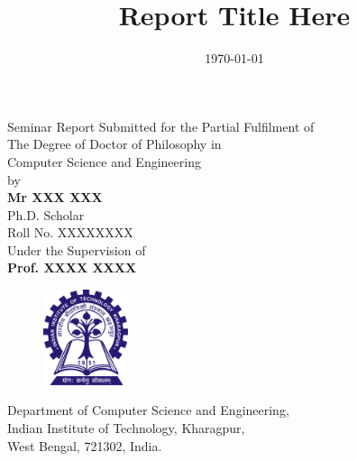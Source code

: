 \documentclass[11pt,a4paper]{article}
\begin{document}
\title{\textbf{Report Title Here}}
\date{{}}
\maketitle
\thispagestyle{empty}
\vspace{-20px}
\begin{center}
	Seminar Report Submitted for the Partial Fulfilment of\\
	The Degree of Doctor of Philosophy in\\
	Computer Science and Engineering\\
	by\\
    \vspace{20px}
	\textbf{Mr XXX XXX}\\
	Ph.D. Scholar\\
	Roll No. XXXXXXXX\\
    \vspace{20px}
	Under the Supervision of\\
    \vspace{5px}
	\textbf{Prof. XXXX XXXX}
\end{center}

\vspace{10px}
\begin{figure}[h]
	\centering
	\includegraphics[height=2.8cm,width=2.5cm]{icons/iitkgplogo.png}
\end{figure}
\vspace{10px}

\begin{center}
{
	Department of Computer Science and Engineering, \\
	Indian Institute of Technology, Kharagpur,\\
	West Bengal, 721302, India.\\
	\date{\today}
}
\end{center}
\newpage

\tableofcontents
\thispagestyle{empty}
\newpage
\end{document}
